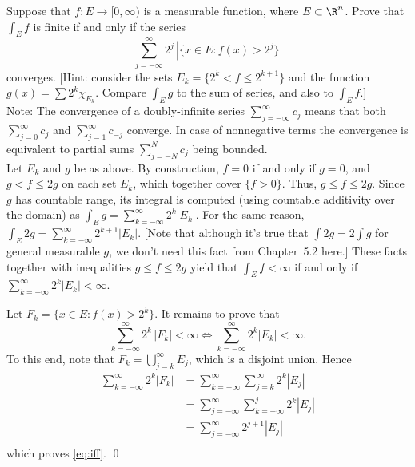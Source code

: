 \begin{hwsol}
Suppose that $f: E \to [0, \infty)$ is a measurable function, where $E \subset \R^n$. Prove that $\int_E f$ is finite if and only if the series 
        \[
        \sum_{j = -\infty}^\infty 2^j \,| \{x \in E \colon f(x)>2^j \}|
        \]
converges. [Hint: consider the sets $E_k = \{2^k<f\leq 2^{k+1}\}$ and the function $g(x)= \sum 2^k \chi_{E_k}$. Compare $\int_E g$ to the sum of series, and also to $\int_E f$.] \\

\noindent Note: The convergence of a doubly-infinite series $\sum_{j= -\infty}^\infty c_j$ means that both $\sum_{j=0}^\infty c_j$ and $\sum_{j=1}^\infty c_{-j}$ converge. In case of nonnegative terms the convergence is equivalent to partial sums $\sum_{j = -N}^N c_j$ being bounded. \\

\pf Let $E_k$ and $g$ be as above. By construction, $f= 0$ if and only if $g=0$, and $g < f \leq 2g$ on each set $E_k$, which together cover $\{ f > 0 \}$. Thus, $g \leq f \leq 2g$. Since $g$ has countable range, its integral is computed (using countable additivity over the domain) as $\int_E g= \sum_{k= -\infty}^\infty 2^k |E_k|$. For the same reason, $\int_E 2g=  \sum_{k= -\infty}^\infty 2^{k+1} |E_k|$. [Note that although it's true that $\int 2g= 2 \int g$ for general measurable $g$, we don't need this fact from Chapter~5.2 here.] These facts together with inequalities $g \leq f \leq 2g$ yield that $\int_E f < \infty$ if and only if $\sum_{k= -\infty}^\infty 2^k |E_k| < \infty$.

Let $F_k= \{ x \in E \colon f(x) > 2^k \}$. It remains to prove that 
	\begin{equation} \label{eq:iff}
	\sum_{k= -\infty}^\infty 2^k \, |F_k| < \infty \iff \sum_{k=-\infty}^\infty 2^k |E_k| < \infty.
	\end{equation} 
To this end, note that $F_k = \bigcup_{j=k}^\infty E_j$, which is a disjoint union. Hence
        \[
        \begin{split}
        \sum_{k= -\infty}^\infty 2^k |F_k|&= \sum_{k= -\infty}^\infty \sum_{j=k}^\infty 2^k  |E_j| \\ 
        &= \sum_{j= -\infty}^\infty \sum_{k= -\infty }^{j} 2^k |E_j|  \\ 
        &= \sum_{j= -\infty}^\infty  2^{j+1} |E_j|  \\ 
        \end{split}
        \]
which proves \eqref{eq:iff}. \qed \\
\end{hwsol}


